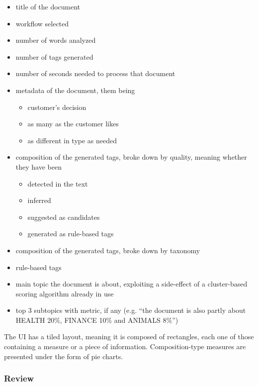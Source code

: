 \documentclass[12pt,oneside,svgnames]{memoir}
\begin{document}
\begin{itemize}
\itemsep1pt\parskip0pt
\item
  title of the document
\item
  workflow selected
\item
  number of words analyzed
\item
  number of tags generated
\item
  number of seconds needed to process that document
\item
  metadata of the document, them being

  \begin{itemize}
  \itemsep1pt\parskip0pt
  \item
    customer's decision
  \item
    as many as the customer likes
  \item
    as different in type as needed
  \end{itemize}
\item
  composition of the generated tags, broke down by quality, meaning
  whether they have been

  \begin{itemize}
  \itemsep1pt\parskip0pt
  \item
    detected in the text
  \item
    inferred
  \item
    suggested as candidates
  \item
    generated as rule-based tags
  \end{itemize}
\item
  composition of the generated tags, broke down by taxonomy
\item
  rule-based tags
\item
  main topic the document is about, exploiting a side-effect of a
  cluster-based scoring algorithm already in use
\item
  top 3 subtopics with metric, if any (e.g. ``the document is also
  partly about HEALTH 20\%, FINANCE 10\% and ANIMALS 8\%'')
\end{itemize}

The UI has a tiled layout, meaning it is composed of rectangles, each
one of those containing a measure or a piece of information.
Composition-type measures are presented under the form of pie charts.

\subsubsection*{Review}\label{review}
\end{document}
